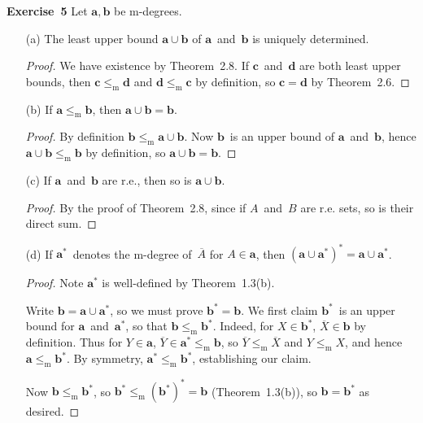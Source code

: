 \documentclass[letterpaper]{article}
\newcommand{\exercise}[2][]{\noindent\textbf{Exercise~{#2}}\ifthenelse{\isempty{#1}}{\textbf{.}}{ ({#1})\textbf{.}}}
\newcommand{\mr}{\mathrel{\le_{\mathrm{m}}}}
\newcommand{\dg}[1]{\mathbf{{#1}}}
\newcommand{\lub}{\cup}
\theoremstyle{plain}
\theoremstyle{definition}
\theoremstyle{remark}
\begin{document}
\exercise{5}
Let $\dg{a},\dg{b}$ be m-degrees.
\begin{enumerate}
\item[(a)] The least upper bound $\dg{a}\lub\dg{b}$ of $\dg{a}$~and~$\dg{b}$ is uniquely determined.
\begin{proof}
We have existence by Theorem~2.8. If $\dg{c}$~and~$\dg{d}$ are both least upper bounds, then $\dg{c}\mr\dg{d}$ and $\dg{d}\mr\dg{c}$ by definition, so $\dg{c}=\dg{d}$ by Theorem~2.6.
\end{proof}

\item[(b)] If $\dg{a}\mr\dg{b}$, then $\dg{a}\lub\dg{b}=\dg{b}$.
\begin{proof}
By definition $\dg{b}\mr\dg{a}\lub\dg{b}$. Now $\dg{b}$~is an upper bound of $\dg{a}$~and~$\dg{b}$, hence $\dg{a}\lub\dg{b}\mr\dg{b}$ by definition, so $\dg{a}\lub\dg{b}=\dg{b}$.
\end{proof}

\item[(c)] If $\dg{a}$~and~$\dg{b}$ are r.e., then so is $\dg{a}\lub\dg{b}$.
\begin{proof}
By the proof of Theorem~2.8, since if $A$~and~$B$ are r.e. sets, so is their direct sum.
\end{proof}

\item[(d)] If $\dg{a}^*$~denotes the m-degree of~$\overline{A}$ for $A\in\dg{a}$, then $(\dg{a}\lub\dg{a}^*)^*=\dg{a}\lub\dg{a}^*$.
\begin{proof}
Note $\dg{a}^*$ is well-defined by Theorem~1.3(b).

Write $\dg{b}=\dg{a}\lub\dg{a}^*$, so we must prove $\dg{b}^*=\dg{b}$. We first claim $\dg{b}^*$~is an upper bound for $\dg{a}$~and~$\dg{a}^*$, so that $\dg{b}\mr\dg{b}^*$. Indeed, for $X\in\dg{b}^*$, $\overline{X}\in\dg{b}$ by definition. Thus for $Y\in\dg{a}$, $\overline{Y}\in\dg{a}^*\mr\dg{b}$, so $\overline{Y}\mr\overline{X}$ and $Y\mr X$, and hence $\dg{a}\mr\dg{b}^*$. By symmetry, $\dg{a}^*\mr\dg{b}^*$, establishing our claim.

Now $\dg{b}\mr\dg{b}^*$, so $\dg{b}^*\mr(\dg{b}^*)^*=\dg{b}$ (Theorem~1.3(b)), so $\dg{b}=\dg{b}^*$ as desired.
\end{proof}
\end{enumerate}
\end{document}
